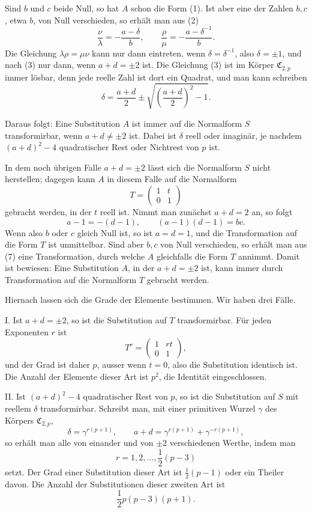 \documentclass[11pt]{article}
\providecommand{\mat}[4]{\begin{pmatrix}#1&#2\\#3&#4\end{pmatrix}}
\providecommand{\mat}[4]{\begin{pmatrix}#1&#2\\#3&#4\end{pmatrix}}
\providecommand{\Cfield}{\mathfrak C}
\providecommand{\mat}[1]{\begin{pmatrix}#1\end{pmatrix}}
\begin{document}
Sind $b$ und $c$ beide Null, so hat $A$ schon die Form (1). Ist aber eine der Zahlen $b,c$, etwa $b$, von Null verschieden, so erhält man aus (2)
\begin{equation}
 \frac{\nu}{\lambda}=-\frac{a-\delta}{b},\qquad
 \frac{\rho}{\mu}=-\frac{a-\delta^{-1}}{b}.
 \tag{4}
\end{equation}
Die Gleichung $\lambda\rho=\mu\nu$ kann nur dann eintreten, wenn $\delta=\delta^{-1}$, also $\delta=\pm1$, und nach (3) nur dann, wenn $a+d=\pm2$ ist. Die Gleichung (3) ist im Körper $\Cfield_{2,p}$ immer lösbar, denn jede reelle Zahl ist dort ein Quadrat, und man kann schreiben
\begin{equation}
 \delta=\frac{a+d}{2}\pm \sqrt{\left(\frac{a+d}{2}\right)^2-1}.
 \tag{5}
\end{equation}

Daraus folgt: Eine Substitution $A$ ist immer auf die Normalform $S$ transformirbar, wenn $a+d\ne\pm2$ ist. Dabei ist $\delta$ reell oder imaginär, je nachdem $(a+d)^2-4$ quadratischer Rest oder Nichtrest von $p$ ist.

In dem noch übrigen Falle $a+d=\pm2$ lässt sich die Normalform $S$ nicht herstellen; dagegen kann $A$ in diesem Falle auf die Normalform
\begin{equation}
 T=\mat{1}{t}{0}{1}
 \tag{6}
\end{equation}
gebracht werden, in der $t$ reell ist. Nimmt man zunächst $a+d=2$ an, so folgt
\begin{equation}
 a-1=-(d-1),\qquad (a-1)(d-1)=bc.
 \tag{7}
\end{equation}
Wenn also $b$ oder $c$ gleich Null ist, so ist $a=d=1$, und die Transformation auf die Form $T$ ist unmittelbar. Sind aber $b,c$ von Null verschieden, so erhält man aus (7) eine Transformation, durch welche $A$ gleichfalls die Form $T$ annimmt. Damit ist bewiesen: Eine Substitution $A$, in der $a+d=\pm2$ ist, kann immer durch Transformation auf die Normalform $T$ gebracht werden.

Hiernach lassen sich die Grade der Elemente bestimmen. Wir haben drei Fälle.

I. Ist $a+d=\pm2$, so ist die Substitution auf $T$ transformirbar. Für jeden Exponenten $r$ ist
\[
 T^r=\mat{1}{rt}{0}{1},
\]
und der Grad ist daher $p$, ausser wenn $t=0$, also die Substitution identisch ist. Die Anzahl der Elemente dieser Art ist $p^2$, die Identität eingeschlossen.

II. Ist $(a+d)^2-4$ quadratischer Rest von $p$, so ist die Substitution auf $S$ mit reellem $\delta$ transformirbar. Schreibt man, mit einer primitiven Wurzel $\gamma$ des Körpers $\Cfield_{2,p}$,
\begin{equation}
 \delta=\gamma^{r(p+1)},\qquad
 a+d=\gamma^{r(p+1)}+\gamma^{-r(p+1)},
 \tag{8}
\end{equation}
so erhält man alle von einander und von $\pm2$ verschiedenen Werthe, indem man
\begin{equation}
 r=1,2,\ldots,\frac12(p-3)
 \tag{9}
\end{equation}
setzt. Der Grad einer Substitution dieser Art ist $\frac12(p-1)$ oder ein Theiler davon. Die Anzahl der Substitutionen dieser zweiten Art ist
\[
 \frac12 p(p-3)(p+1).
\]
\end{document}
